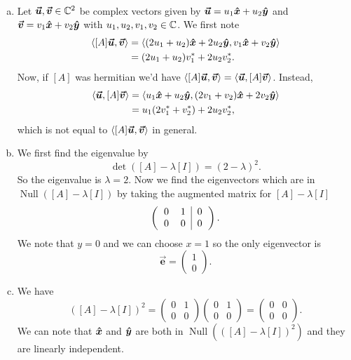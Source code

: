 \documentclass[12pt]{article} %
\newcommand{\Null}{\operatorname{Null}}
\newcommand{\evec}{\vec{\boldsymbol{e}}}
\begin{document}
\begin{solution}~
\begin{enumerate}[(a)]
    \item Let $\boldsymbol{\boldsymbol{\vec{u}}},\boldsymbol{\boldsymbol{\vec{v}}}\in \mathbb{C}^2$ be complex vectors given by $\boldsymbol{\boldsymbol{\vec{u}}}=u_1\boldsymbol{\hat{x}}+u_2\boldsymbol{\hat{y}}$ and $\boldsymbol{\boldsymbol{\vec{v}}}=v_1\boldsymbol{\hat{x}}+v_2\boldsymbol{\hat{y}}$ with $u_1,u_2,v_1,v_2\in \mathbb{C}$.  We first note
    \begin{align*}
    \langle [A]\boldsymbol{\boldsymbol{\vec{u}}},\boldsymbol{\boldsymbol{\vec{v}}}\rangle &= \langle (2u_1 + u_2)\boldsymbol{\hat{x}} + 2u_2\boldsymbol{\hat{y}},v_1\boldsymbol{\hat{x}} + v_2\boldsymbol{\hat{y}} \rangle\\
    &= (2u_1+u_2)v_1^* + 2u_2v_2^*.
    \end{align*}
    Now, if $[A]$ was hermitian we'd have $\langle [A]\boldsymbol{\boldsymbol{\vec{u}}},\boldsymbol{\boldsymbol{\vec{v}}}\rangle = \langle \boldsymbol{\boldsymbol{\vec{u}}},[A]\boldsymbol{\boldsymbol{\vec{v}}}\rangle$. Instead,
    \begin{align*}
    \langle \boldsymbol{\boldsymbol{\vec{u}}},[A]\boldsymbol{\boldsymbol{\vec{v}}} \rangle &= \langle u_1\boldsymbol{\hat{x}} + u_2\boldsymbol{\hat{y}},(2v_1+v_2)\boldsymbol{\hat{x}}+2v_2 \boldsymbol{\hat{y}} \rangle\\
    &= u_1(2v_1^*+v_2^*)+2u_2v_2^*,
    \end{align*}
    which is not equal to $\langle [A]\boldsymbol{\boldsymbol{\vec{u}}},\boldsymbol{\boldsymbol{\vec{v}}}\rangle$ in general.

    \item We first find the eigenvalue by 
    \[
    \det([A]-\lambda [I])= (2-\lambda)^2.
    \]
    So the eigenvalue is $\lambda=2$. Now we find the eigenvectors which are in $\Null([A]-\lambda[I])$ by taking the augmented matrix for $[A]-\lambda[I]$
    \[
    \left( \begin{tabular}{cc|c} 0 & 1 & 0 \\ 0 & 0 & 0 \end{tabular}\right).
    \]
    We note that $y=0$ and we can choose $x=1$ so the only eigenvector is 
    \[
    \evec = \begin{pmatrix} 1 \\ 0 \end{pmatrix}.
    \]

    \item We have
    \[
    ([A]-\lambda [I])^2 = \begin{pmatrix} 0 & 1 \\ 0 & 0 \end{pmatrix}\begin{pmatrix} 0 & 1 \\ 0 & 0 \end{pmatrix} = \begin{pmatrix} 0 & 0 \\ 0 & 0 \end{pmatrix}.
    \]
    We can note that $\boldsymbol{\hat{x}}$ and $\boldsymbol{\hat{y}}$ are both in $\Null(([A]-\lambda [I])^2)$ and they are linearly independent. 
\end{enumerate}
\end{solution}
\end{document}
